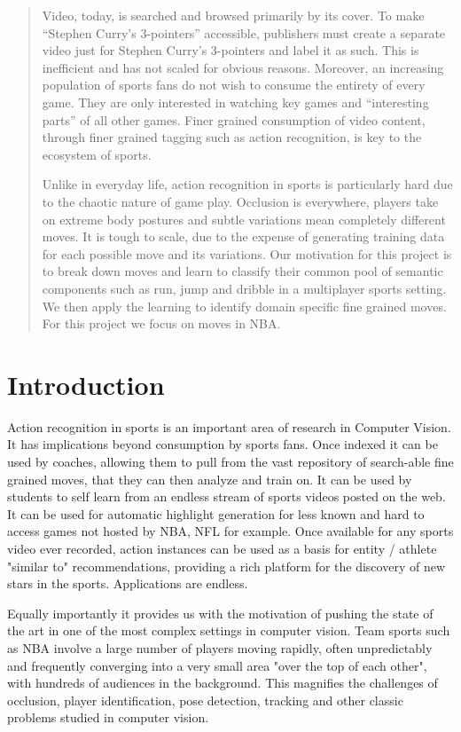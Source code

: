 \documentclass{article}
\begin{document}
\begin{abstract}
Video, today, is searched and browsed primarily by its cover. To make “Stephen Curry’s 3-pointers” accessible, publishers must create a separate video just for Stephen Curry’s 3-pointers and label it as such. This is inefficient and has not scaled for obvious reasons. Moreover, an increasing population of sports fans do not wish to consume the entirety of every game. They are only interested in watching key games and “interesting parts” of all other games. Finer grained consumption of video content, through finer grained tagging such as action recognition, is key to the ecosystem of sports.

Unlike in everyday life, action recognition in sports is particularly hard due to the chaotic nature of game play. Occlusion is everywhere, players take on extreme body postures and subtle variations mean completely different moves. It is tough to scale, due to the expense of generating training data for each possible move and its variations. Our motivation for this project is to break down moves and learn to classify their common pool of semantic components such as run, jump and dribble in a multiplayer sports setting. We then apply the learning to identify domain specific fine grained moves. For this project we focus on moves in NBA.
\end{abstract}

\section{Introduction}
\label{introduction}
Action recognition in sports is an important area of research in Computer Vision. It has implications beyond consumption by sports fans. Once indexed it can be used by coaches, allowing them to pull from the vast repository of search-able fine grained moves, that they can then analyze and train on. It can be used by students to self learn from an endless stream of sports videos posted on the web. It can be used for automatic highlight generation for less known and hard to access games not hosted by NBA, NFL for example. Once available for any sports video ever recorded, action instances can be used as a basis for entity / athlete "similar to" recommendations, providing a rich platform for the discovery of new stars in the sports. Applications are endless.

Equally importantly it provides us with the motivation of pushing the state of the art in one of the most complex settings in computer vision. Team sports such as NBA involve a large number of players moving rapidly, often unpredictably and frequently converging into a very small area "over the top of each other", with hundreds of audiences in the background. This magnifies the challenges of occlusion, player identification, pose detection, tracking and other classic problems studied in computer vision. 
\end{document}
